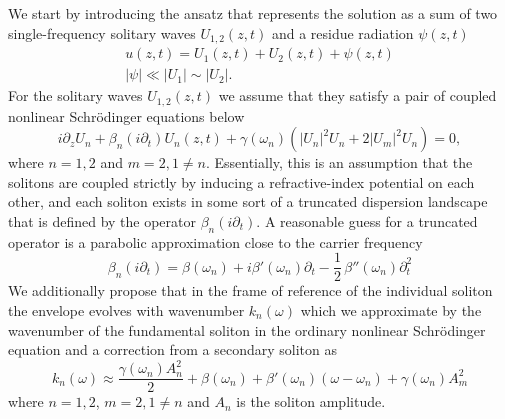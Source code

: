 \documentclass[aps, prl, twocolumn, superscriptaddress, final]{revtex4}
\newcommand{\abs}[1]{\left| #1 \right|}
\begin{document}
\begin{widetext}

\noindent We start by introducing the ansatz that represents the solution as a sum of two single-frequency solitary waves $U_{1, 2}(z, t)$ and a residue radiation $\psi(z, t)$
\begin{gather}
  \label{eq:PerturbationAnsatz}
  u(z, t) = U_{1}(z, t) + U_{2}(z, t) + \psi(z, t) \\
  \abs{\psi} \ll \abs{U_{1}} \sim \abs{U_{2}}. \nonumber
\end{gather}
For the solitary waves $U_{1, 2}(z, t)$ we assume that they satisfy a pair of coupled nonlinear Schr\"odinger equations below
\begin{equation}
  \label{eq:CoupledSolitons}
  i \partial_{z} U_{n}
    + \beta_{n}(i \partial_{t}) U_{n}(z, t)
    + \gamma(\omega_{n}) \left(
      \abs{U_{n}}^{2} U_{n} + 2 \abs{U_{m}}^{2} U_{n}
    \right) = 0,
\end{equation}
where $n = 1, 2$ and $m = 2, 1 \ne n$. Essentially, this is an assumption that the solitons are coupled strictly by inducing a refractive-index potential on each other, and each soliton exists in some sort of a truncated dispersion landscape that is defined by the operator $\beta_{n}(i \partial_{t})$. A reasonable guess for a truncated operator is a parabolic approximation close to the carrier frequency
\begin{equation}
  \label{eq:TruncatedDispersionOperator}
  \beta_{n}(i \partial_{t}) =
    \beta(\omega_{n}) +
    i \beta'(\omega_{n}) \partial_{t} -
    \frac{1}{2} \, \beta''(\omega_{n}) \partial_{t}^{2}
\end{equation}
We additionally propose that in the frame of reference of the individual soliton the envelope evolves with wavenumber $k_{n}(\omega)$ which we approximate by the wavenumber of the fundamental soliton in the ordinary nonlinear Schr\"odinger equation and a correction from a secondary soliton as
\begin{equation}
  \label{eq:SolitonWavenumber}
  k_{n}(\omega)
    \approx \frac{\gamma(\omega_{n}) A_{n}^{2}}{2}
    + \beta(\omega_{n}) + \beta'(\omega_{n}) (\omega - \omega_{n})
    + \gamma(\omega_{n}) A_{m}^{2}
\end{equation}
where $n = 1, 2$, $m = 2, 1 \ne n$ and $A_{n}$ is the soliton amplitude.


\end{widetext}
\end{document}
